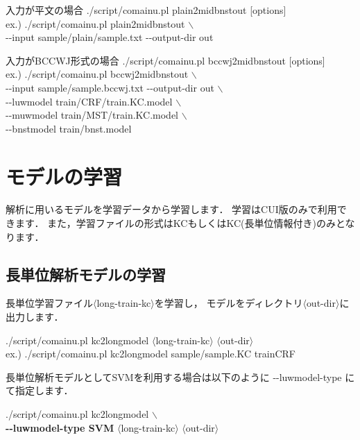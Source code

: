 \documentclass[titlepage]{jarticle}
\begin{document}
 \begin{itembox}[l]{入力が平文の場合}
./script/comainu.pl plain2midbnstout [options] \\
ex.) ./script/comainu.pl plain2midbnstout $\backslash$ \\
\hspace{10mm} {-}{-}input sample/plain/sample.txt {-}{-}output-dir out
\end{itembox}

\begin{itembox}[l]{入力がBCCWJ形式の場合}
./script/comainu.pl bccwj2midbnstout [options] \\
ex.) ./script/comainu.pl bccwj2midbnstout $\backslash$ \\
\hspace{10mm} {-}{-}input sample/sample.bccwj.txt  {-}{-}output-dir out $\backslash$ \\
\hspace{10mm} {-}{-}luwmodel train/CRF/train.KC.model $\backslash$ \\
\hspace{10mm} {-}{-}muwmodel train/MST/train.KC.model $\backslash$ \\
\hspace{10mm} {-}{-}bnstmodel train/bnst.model
\end{itembox}
\clearpage



\section{モデルの学習}\label{sec:learn_model}
解析に用いるモデルを学習データから学習します．
学習はCUI版のみで利用できます．
また，学習ファイルの形式はKCもしくはKC(長単位情報付き)のみとなります．

\subsection{長単位解析モデルの学習}\label{learn_long}
長単位学習ファイル$\langle$long-train-kc$\rangle$を学習し，
モデルをディレクトリ$\langle$out-dir$\rangle$に出力します．
\begin{screen}
./script/comainu.pl kc2longmodel $\langle$long-train-kc$\rangle$ $\langle$out-dir$\rangle$ \\
ex.) ./script/comainu.pl kc2longmodel sample/sample.KC trainCRF
\end{screen}
長単位解析モデルとしてSVMを利用する場合は以下のように {-}{-}luwmodel-type にて指定します．
\begin{screen}
./script/comainu.pl kc2longmodel $\backslash$ \\
\hspace{5mm} \textbf{{-}{-}luwmodel-type SVM} $\langle$long-train-kc$\rangle$ $\langle$out-dir$\rangle$
\end{screen}
\end{document}
